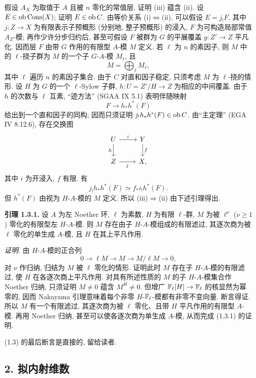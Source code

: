 假设 $A_X$ 为取值于 $A$ 且被 $n$ 零化的常值层, 证明 (iii) 蕴含 (ii). 设 $E\in\operatorname{ob}\operatorname{Cons}(X)$; 证明 $E\in\operatorname{ob} C$. 由等价关系 (i)$\Leftrightarrow$(ii), 可以假设 $E=j_!F$, 其中 $j:Z\to X$ 为有限表示子预概形 (分别地, 整子预概形) 的浸入, $F$ 为可构造局部常值 $A_Z$-模; 再作少许分步归约后, 甚至可假设 $F$ 被群为 $G$ 的平展覆盖 $g:Z'\to Z$ 平凡化. 因而层 $F$ 由带 $G$ 作用的有限型 $A$-模 $M$ 定义. 若 $\ell$ 为 $n$ 的素因子, 则 $M$ 中的 $\ell$-挠子群为 $M$ 的一个子 $G$-$A$-模 $M_\ell$, 且
\[
        M=\bigoplus_\ell M_\ell,
\]
其中 $\ell$ 遍历 $n$ 的素因子集合. 由于 $C$ 对直和因子稳定, 只须考虑 $M$ 为 $\ell$-挠的情形. 设 $H$ 为 $G$ 的一个 $\ell$-Sylow 子群, $h:U=Z'/H\to Z$ 为相应的中间覆盖. 由于 $h$ 的次数与 $\ell$ 互素, “迹方法” (SGAA IX 5.1) 表明伴随映射
\[
        F\longrightarrow h_*h^*(F)
\]
给出到一个直和因子的同构; 因而只须证明 $j_!h_*h^*(F)\in\operatorname{ob} C$. 由“主定理” (EGA IV 8.12.6), 存在交换图
\[
\begin{tikzcd}
U \arrow[r,"i"] \arrow[d,"h"'] & Y \arrow[d,"f"]\\
Z \arrow[r,"j"'] & X,
\end{tikzcd}
\]
其中 $i$ 为开浸入, $f$ 有限. 有
\[
        j_!h_*h^*(F) \simeq f_* i_! h^*(F).
\]
但 $h^*(F)$ 由视为 $H$-$A$-模的 $M$ 定义. 所以 (iii)$\Rightarrow$(ii) 由下述引理得出.

\textbf{引理 1.3.1.} 设 $A$ 为左 Noether 环, $\ell$ 为素数, $H$ 为有限 $\ell$-群, $M$ 为被 $\ell^\nu$ ($\nu\geq1$) 零化的有限型左 $H$-$A$-模. 则 $M$ 存在由子 $H$-$A$-模组成的有限滤过, 其逐次商为被 $\ell$ 零化的单生成 $A$-模, 且 $H$ 在其上平凡作用.

\emph{证明.} 由 $H$-$A$-模的正合列
\[
        0\longrightarrow \ell M\longrightarrow M\longrightarrow M/\ell M\longrightarrow 0,
\]
对 $\nu$ 作归纳, 归结为 $M$ 被 $\ell$ 零化的情形. 证明此时 $M$ 存在子 $H$-$A$-模的有限滤过, 使 $H$ 在各逐次商上平凡作用. 对具有所述性质的 $M$ 的子 $H$-$A$-模集合作 Noether 归纳, 只须证明 $M\neq0$ 蕴含 $M^H\neq0$. 但增广 $\mathbb{F}_\ell[H]\to\mathbb{F}_\ell$ 的核显然为幂零的, 因而 Nakayama 引理意味着每个非零 $H$-$\mathbb{F}_\ell$-模都有非零不变向量. 断言得证. 所以 $M$ 有一个有限滤过, 其逐次商为被 $\ell$ 零化、且带 $H$ 平凡作用的有限型 $A$-模. 再用 Noether 归纳, 甚至可以使各逐次商为单生成 $A$-模, 从而完成 (1.3.1) 的证明.

(1.3) 的最后断言是直接的, 留给读者.

\subsection*{2. 拟内射维数}

